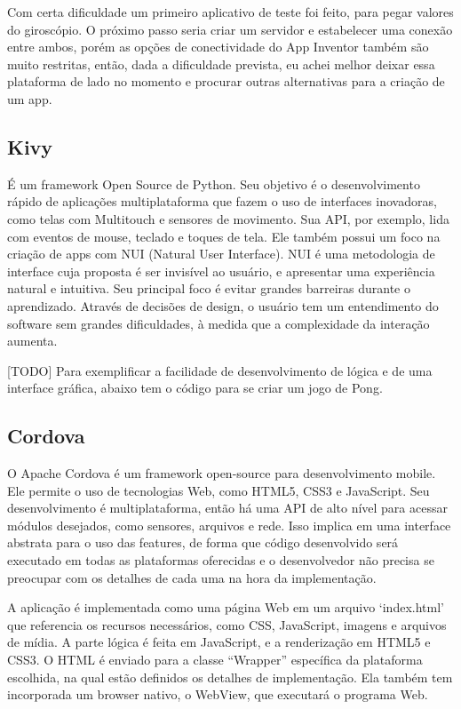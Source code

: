 \documentclass[a4paper,12pt]{article}
\begin{document}
Com certa dificuldade um primeiro aplicativo de teste foi feito, para pegar valores do giroscópio. O próximo passo seria criar um servidor e estabelecer uma conexão entre ambos, porém as opções de conectividade do App Inventor também são muito restritas, então, dada a dificuldade prevista, eu achei melhor deixar essa plataforma de lado no momento e procurar outras alternativas para a criação de um app.


\subsection{Kivy}

É um framework Open Source de Python. Seu objetivo é o desenvolvimento rápido de aplicações multiplataforma que fazem o uso de interfaces inovadoras, como telas com Multitouch e sensores de movimento. Sua API, por exemplo, lida com eventos de mouse, teclado e toques de tela. Ele também possui um foco na criação de apps com NUI (Natural User Interface).
  NUI é uma metodologia de interface cuja proposta é ser invisível ao usuário, e apresentar uma experiência natural e intuitiva. Seu principal foco é evitar grandes barreiras durante o aprendizado. Através de decisões de design, o usuário tem um entendimento do software sem grandes dificuldades, à medida que a complexidade da interação aumenta.

[TODO] Para exemplificar a facilidade de desenvolvimento de lógica e de uma interface gráfica, abaixo tem o código para se criar um jogo de Pong.



\subsection{Cordova}

O Apache Cordova é um framework open-source para desenvolvimento mobile. Ele permite o uso de tecnologias Web, como HTML5, CSS3 e JavaScript. Seu desenvolvimento é multiplataforma, então há uma API de alto nível para acessar módulos desejados, como sensores, arquivos e rede. Isso implica em uma interface abstrata para o uso das features, de forma que código desenvolvido será executado em todas as plataformas oferecidas e o desenvolvedor não precisa se preocupar com os detalhes de cada uma na hora da implementação.


A aplicação é implementada como uma página Web em um arquivo ‘index.html’ que referencia os recursos necessários, como CSS, JavaScript, imagens e arquivos de mídia. A parte lógica é feita em JavaScript, e a renderização em HTML5 e CSS3. O HTML é enviado para a classe “Wrapper” específica da plataforma escolhida, na qual estão definidos os detalhes de implementação. Ela também tem incorporada um browser nativo, o WebView, que executará o programa Web.
\end{document}
